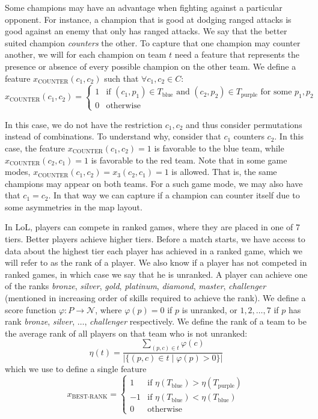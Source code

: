 Some champions may have an advantage when fighting against a particular opponent.
For instance, a champion that is good at dodging ranged attacks is good against an enemy that only has ranged attacks.
We say that the better suited champion \emph{counters} the other.
To capture that one champion may counter another, we will for each champion on team $t$ need a feature that represents the presence or absence of every possible champion on the other team.
We define a feature $x_\text{COUNTER}(c_1, c_2)$ such that $\forall c_1, c_2 \in C:$
\[x_\text{COUNTER}(c_1, c_2) = 
\begin{cases} 
1 & \text{if } (c_1, p_1) \in T_\text{blue} \text{ and } (c_2, p_2) \in T_\text{purple} \text{ for some } p_1, p_2 \\ 
0 & \text{otherwise} 
\end{cases}\]

In this case, we do not have the restriction $c_1, c_2$ and thus consider permutations instead of combinations.
To understand why, consider that $c_1$ counters $c_2$.
In this case, the feature $x_\text{COUNTER}(c_1, c_2) = 1$ is favorable to the blue team, while $x_\text{COUNTER}(c_2, c_1) = 1$ is favorable to the red team.
Note that in some game modes, $x_\text{COUNTER}(c_1, c_2) = x_3(c_2, c_1) = 1$ is allowed. That is, the same champions may appear on both teams.
For a such game mode, we may also have that $c_1 = c_2$.
In that way we can capture if a champion can counter itself due to some asymmetries in the map layout.

In LoL, players can compete in ranked games, where they are placed in one of 7 tiers. Better players achieve higher tiers.
Before a match starts, we have access to data about the highest tier each player has achieved in a ranked game, which we will refer to as the rank of a player. We also know if a player has not competed in ranked games, in which case we say that he is unranked.
A player can achieve one of the ranks \textit{bronze}, \textit{silver}, \textit{gold}, \textit{platinum}, \textit{diamond}, \textit{master}, \textit{challenger} (mentioned in increasing order of skills required to achieve the rank).
We define a score function $\varphi : P \rightarrow \mathcal{N}$, where $\varphi(p) = 0$ if $p$ is unranked, or $1, 2, \dots, 7$ if $p$ has rank \textit{bronze}, \textit{silver}, $\dots$, \textit{challenger} respectively.
We define the rank of a team to be the average rank of all players on that team who is not unranked:
\[
\eta(t) = \frac{\sum\limits_{(p, c) \in t} \varphi(c)}{|\{(p, c) \in t \mid \varphi(p) > 0\}|}
\]
which we use to define a single feature
\[
x_\text{BEST-RANK} = 
\begin{cases} 
  1 & \text{if } \eta(T_\text{blue}) > \eta(T_\text{purple})\\
  -1 & \text{if } \eta(T_\text{blue}) < \eta(T_\text{blue})\\
  0 & \text{otherwise} 
\end{cases}
\]

